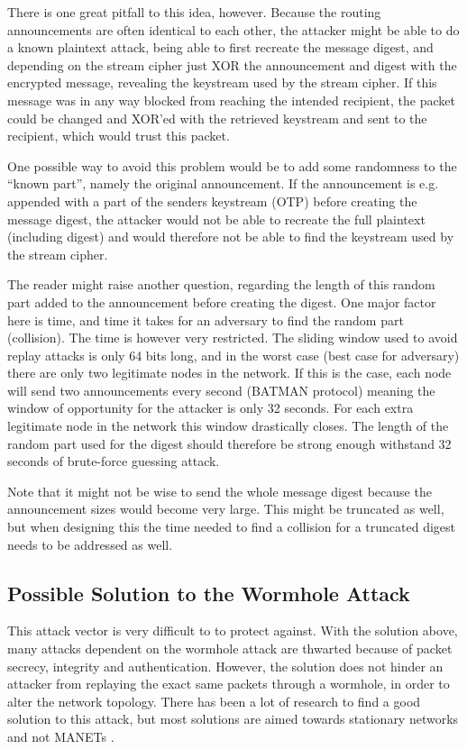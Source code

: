 There is one great pitfall to this idea, however. Because the routing
announcements are often identical to each other, the attacker might be able to
do a known plaintext attack, being able to first recreate the message digest,
and depending on the stream cipher just XOR the announcement and digest with the
encrypted message, revealing the keystream used by the stream cipher. If this
message was in any way blocked from reaching the intended recipient, the packet
could be changed and XOR'ed with the retrieved keystream and sent to the
recipient, which would trust this packet.

One possible way to avoid this problem would be to add some randomness to the
``known part'', namely the original announcement. If the announcement is e.g.
appended with a part of the senders keystream (\ac{OTP}) before creating the
message digest, the attacker would not be able to recreate the full plaintext
(including digest) and would therefore not be able to find the keystream used by
the stream cipher.

The reader might raise another question, regarding the length of this random
part added to the announcement before creating the digest. One major factor
here is time, and time it takes for an adversary to find the random part (collision).
The time is however very restricted. The sliding window used to avoid replay
attacks is only 64 bits long, and in the worst case (best case for adversary)
there are only two legitimate nodes in the network. If this is the case, each
node will send two announcements every second (BATMAN protocol) meaning the
window of opportunity for the attacker is only 32 seconds. For each extra
legitimate node in the network this window drastically closes. The length of the
random part used for the digest should therefore be strong enough withstand 32
seconds of brute-force guessing attack.

Note that it might not be wise to send the whole message digest because the
announcement sizes would become very large. This might be truncated as well, but
when designing this the time needed to find a collision for a truncated digest
needs to be addressed as well.

\subsection{Possible Solution to the Wormhole Attack}
This attack vector is very difficult to to protect against. With the solution
above, many attacks dependent on the wormhole attack are thwarted because of
packet secrecy, integrity and authentication. However, the solution does not
hinder an attacker from replaying the exact same packets through a wormhole, in
order to alter the network topology. There has been a lot of research to find a
good solution to this attack, but most solutions are aimed towards stationary
networks and not \acp{MANET} \cite{raoteapproaches}.

